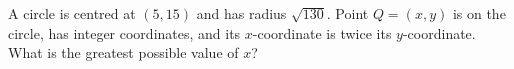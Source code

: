 A circle is centred at $(5,15)$ and has radius $\sqrt{130}$. Point $Q=(x,y)$ is on the circle, has integer coordinates, and its $x$-coordinate is twice its $y$-coordinate. What is the greatest possible value of $x$?
